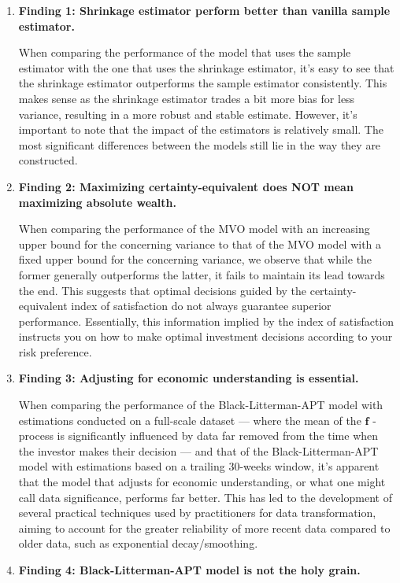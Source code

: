 \documentclass[13pt]{article}
\theoremstyle{definition}
\theoremstyle{remark}
\begin{document}
\begin{enumerate}
    \item \textbf{Finding 1: Shrinkage estimator perform better than vanilla sample estimator.}

    When comparing the performance of the model that uses the sample estimator with the one that uses the shrinkage estimator, it's easy to see that the shrinkage estimator outperforms the sample estimator consistently. This makes sense as the shrinkage estimator trades a bit more bias for less variance, resulting in a more robust and stable estimate. However, it's important to note that the impact of the estimators is relatively small. The most significant differences between the models still lie in the way they are constructed.
    \item \textbf{Finding 2: Maximizing certainty-equivalent does NOT mean maximizing absolute wealth.} 
    
    When comparing the performance of the MVO model with an increasing upper bound for the concerning variance to that of the MVO model with a fixed upper bound for the concerning variance, we observe that while the former generally outperforms the latter, it fails to maintain its lead towards the end. This suggests that optimal decisions guided by the certainty-equivalent index of satisfaction do not always guarantee superior performance. Essentially, this information implied by the index of satisfaction instructs you on how to make optimal investment decisions according to your risk preference.
    \item \textbf{Finding 3: Adjusting for economic understanding is essential.}

     When
comparing the performance of the Black-Litterman-APT model with estimations
conducted on a full-scale dataset — where the mean of the $\bm{f}$ -process is significantly influenced by data far removed from the time when the investor makes
their decision — and that of the Black-Litterman-APT model with estimations
based on a trailing 30-weeks window, it's apparent that the model that adjusts for
economic understanding, or what one might call data significance, performs far
better. This has led to the development of several practical techniques used by practitioners for data transformation, aiming to account for the greater reliability of more recent data compared to older data, such as exponential decay/smoothing.
    \item \textbf{Finding 4: Black-Litterman-APT model is not the holy grain.}


\end{enumerate}
\end{document}

